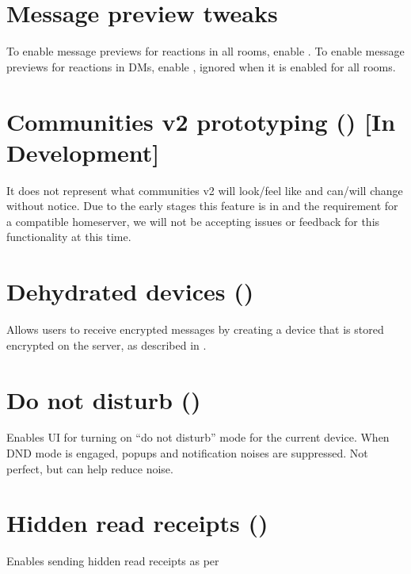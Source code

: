 \documentclass[letterpaper,10pt,openany,oneside,english]{sphinxmanual}
\begin{document}
\chapter{Message preview tweaks}
\label{\detokenize{labs:message-preview-tweaks}}
\sphinxAtStartPar
To enable message previews for reactions in all rooms, enable .
To enable message previews for reactions in DMs, enable , ignored when it is enabled for all rooms.


\chapter{Communities v2 prototyping () {[}In Development{]}}
\label{\detokenize{labs:communities-v2-prototyping-feature-communities-v2-prototypes-in-development}}
\sphinxAtStartPar
{} It does not
represent what communities v2 will look/feel like and can/will change without notice. Due to the early
stages this feature is in and the requirement for a compatible homeserver, we will not be accepting issues
or feedback for this functionality at this time.


\chapter{Dehydrated devices ()}
\label{\detokenize{labs:dehydrated-devices-feature-dehydration}}
\sphinxAtStartPar
Allows users to receive encrypted messages by creating a device that is stored
encrypted on the server, as described in .


\chapter{Do not disturb ()}
\label{\detokenize{labs:do-not-disturb-feature-dnd}}
\sphinxAtStartPar
Enables UI for turning on “do not disturb” mode for the current device. When DND mode is engaged, popups
and notification noises are suppressed. Not perfect, but can help reduce noise.


\chapter{Hidden read receipts ()}
\label{\detokenize{labs:hidden-read-receipts-feature-hidden-read-receipts}}
\sphinxAtStartPar
Enables sending hidden read receipts as per 
\end{document}
